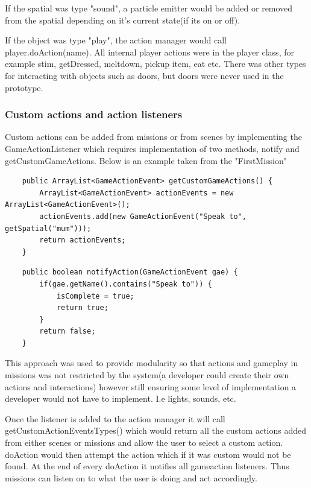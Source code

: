 \documentclass[11pt]{report}
\begin{document}
If the spatial was type "sound", a particle emitter would be added or removed from the spatial depending on it’s current state(if its on or off).

If the object was type "play", the action manager would call player.doAction(name). All internal player actions were in the player class, for example stim, getDressed, meltdown, pickup item, eat etc. There was other types for interacting with objects such as doors, but doors were never used in the prototype.

\subsubsection*{Custom actions and action listeners}
Custom actions can be added from missions or from scenes by implementing the GameActionListener which requires implementation of two methods, notify and getCustomGameActions. Below is an example taken from the "FirstMission"

\begin{lstlisting}
    public ArrayList<GameActionEvent> getCustomGameActions() {
        ArrayList<GameActionEvent> actionEvents = new ArrayList<GameActionEvent>();
        actionEvents.add(new GameActionEvent("Speak to", getSpatial("mum")));
        return actionEvents;
    }
\end{lstlisting}

\begin{lstlisting}
    public boolean notifyAction(GameActionEvent gae) {
        if(gae.getName().contains("Speak to")) {
            isComplete = true;
            return true;
        }
        return false;
    }
\end{lstlisting}

This approach was used to provide modularity so that actions and gameplay in missions was not restricted by the system(a developer could create their own actions and interactions) however still ensuring some level of implementation a developer would not have to implement. I.e lights, sounds, etc.

Once the listener is added to the action manager it will call getCustomActionEventsTypes() which would return all the custom actions added from either scenes or missions and allow the user to select a custom action. doAction would then attempt the action which if it was custom would not be found. At the end of every doAction it notifies all gameaction listeners. Thus missions can listen on to what the user is doing and act accordingly. 
\end{document}

